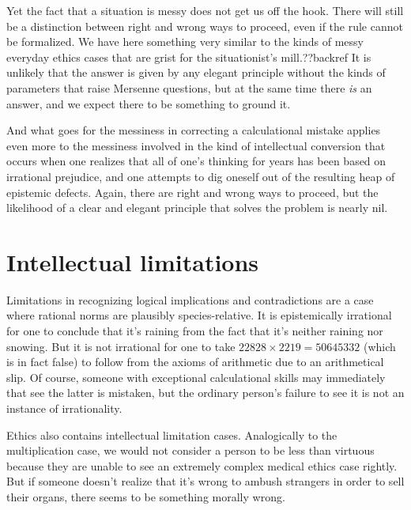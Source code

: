 Yet the fact that a situation is messy does not get us off the hook. There will still
be a distinction between right and wrong ways to proceed, even if the rule cannot be formalized. We have here something very
similar to the kinds of messy everyday ethics cases that are grist for the situationist's mill.??backref 
It is unlikely that the answer is given by any elegant principle without the kinds of parameters that raise Mersenne
questions, but at the same time there \textit{is} an answer, and we expect there to be something to ground it.

And what goes for the messiness in correcting a calculational mistake applies even more to the messiness involved in
the kind of intellectual conversion that occurs when one realizes that all of one's thinking for years has been based
on irrational prejudice, and one attempts to dig oneself out of the resulting heap of epistemic defects. Again, there
are right and wrong ways to proceed, but the likelihood of a clear and elegant principle that solves the problem is
nearly nil. 

\section{Intellectual limitations}
Limitations in recognizing logical implications and contradictions are a case where rational norms are plausibly
species-relative. It is epistemically irrational for one to conclude that it's raining from the fact that it's neither 
raining nor snowing. But it is not irrational for one to take $22828 \times 2219 = 50645332$ (which is in fact
false) to follow from the axioms of arithmetic due to an arithmetical slip. Of course, someone with 
exceptional calculational skills may immediately that see the latter is mistaken, but the ordinary person's failure to see it is 
not an instance of irrationality. 

Ethics also contains intellectual limitation cases. Analogically to the multiplication
case, we would not consider a person to be less than virtuous because they are unable to see an extremely complex medical 
ethics case rightly. But if someone doesn't realize that it's wrong to ambush strangers in order to sell their organs,
there seems to be something morally wrong.

